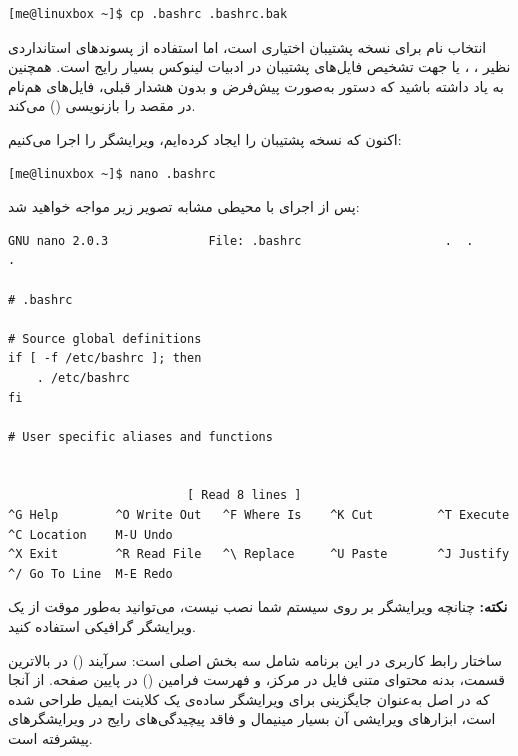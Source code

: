 \begin{latin}
\begin{lstlisting}
[me@linuxbox ~]$ cp .bashrc .bashrc.bak
\end{lstlisting}
\end{latin}

انتخاب نام برای نسخه پشتیبان اختیاری است، اما استفاده از پسوندهای استانداردی نظیر ، ،  یا  جهت تشخیص فایل‌های پشتیبان در ادبیات لینوکس بسیار رایج است. همچنین به یاد داشته باشید که دستور  به‌صورت پیش‌فرض و بدون هشدار قبلی، فایل‌های هم‌نام در مقصد را بازنویسی () می‌کند.

اکنون که نسخه پشتیبان را ایجاد کرده‌ایم، ویرایشگر را اجرا می‌کنیم:

\begin{latin}
\begin{lstlisting}
[me@linuxbox ~]$ nano .bashrc
\end{lstlisting}
\end{latin}

پس از اجرای  با محیطی مشابه تصویر زیر مواجه خواهید شد:

\begin{latin}
\begin{lstlisting}
GNU nano 2.0.3              File: .bashrc                    .  .     .

# .bashrc

# Source global definitions
if [ -f /etc/bashrc ]; then
    . /etc/bashrc
fi

# User specific aliases and functions


                         [ Read 8 lines ]
^G Help        ^O Write Out   ^F Where Is    ^K Cut         ^T Execute     ^C Location    M-U Undo
^X Exit        ^R Read File   ^\ Replace     ^U Paste       ^J Justify     ^/ Go To Line  M-E Redo
\end{lstlisting}
\end{latin}

\begin{note}
\textbf{نکته:} چنانچه ویرایشگر  بر روی سیستم شما نصب نیست، می‌توانید به‌طور موقت از یک ویرایشگر گرافیکی استفاده کنید.
\end{note}

ساختار رابط کاربری در این برنامه شامل سه بخش اصلی است: سرآیند () در بالاترین قسمت، بدنه محتوای متنی فایل در مرکز، و فهرست فرامین () در پایین صفحه. از آنجا که  در اصل به‌عنوان جایگزینی برای ویرایشگر ساده‌ی یک کلاینت ایمیل طراحی شده است، ابزارهای ویرایشی آن بسیار مینیمال و فاقد پیچیدگی‌های رایج در ویرایشگرهای پیشرفته است.

